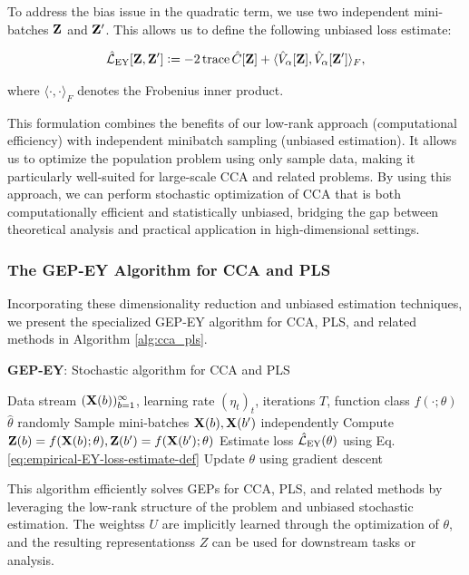 To address the bias issue in the quadratic term, we use two independent mini-batches $\mathbf{Z}$ and $\mathbf{Z}'$. This allows us to define the following unbiased loss estimate:

\begin{align}\label{eq:empirical-EY-loss-estimate-def}
\hat{\mathcal{L}}_\text{EY}[\mathbf{Z}, \mathbf{Z}'] \vcentcolon= - 2 \operatorname{trace} \hat{C}[\mathbf{Z}] + \langle \hat{V}_\alpha[\mathbf{Z}], \hat{V}_\alpha[\mathbf{Z}'] \rangle_F,
\end{align}

where $\langle \cdot, \cdot \rangle_F$ denotes the Frobenius inner product. 

This formulation combines the benefits of our low-rank approach (computational efficiency) with independent minibatch sampling (unbiased estimation). It allows us to optimize the population problem using only sample data, making it particularly well-suited for large-scale CCA and related problems. By using this approach, we can perform stochastic optimization of CCA that is both computationally efficient and statistically unbiased, bridging the gap between theoretical analysis and practical application in high-dimensional settings.

\subsubsection{The GEP-EY Algorithm for CCA and PLS}
Incorporating these dimensionality reduction and unbiased estimation techniques, we present the specialized GEP-EY algorithm for CCA, PLS, and related methods in Algorithm \ref{alg:cca_pls}.

\begin{algorithm}
    \caption{\textbf{GEP-EY}: Stochastic algorithm for CCA and PLS}
    \label{alg:cca_pls}
    \begin{algorithmic}
     Data stream $(\mathbf{X}(b))_{b=1}^\infty$, learning rate $(\eta_t)_t$, iterations $T$, function class $f(\cdot; \theta)$
     $\hat{\theta}$ randomly
    \STATE Sample mini-batches $\mathbf{X}(b), \mathbf{X}(b')$ independently
    \STATE Compute $\mathbf{Z}(b) = f(\mathbf{X}(b); \theta), \mathbf{Z}(b') = f(\mathbf{X}(b'); \theta)$
    \STATE Estimate loss $\hat{\mathcal{L}}_\text{EY}(\theta)$ using Eq. \eqref{eq:empirical-EY-loss-estimate-def}
    \STATE Update $\theta$ using gradient descent
    \ENDFOR
    \end{algorithmic}
    \end{algorithm}

This algorithm efficiently solves GEPs for CCA, PLS, and related methods by leveraging the low-rank structure of the problem and unbiased stochastic estimation. The \glspl{weights} $U$ are implicitly learned through the optimization of $\theta$, and the resulting \glspl{representations} $Z$ can be used for downstream tasks or analysis.

